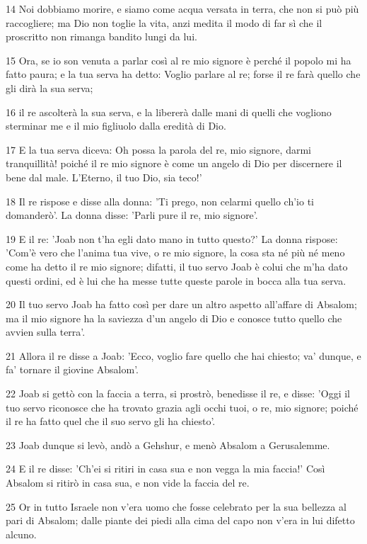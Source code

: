 \par 14 Noi dobbiamo morire, e siamo come acqua versata in terra, che non si può più raccogliere; ma Dio non toglie la vita, anzi medita il modo di far sì che il proscritto non rimanga bandito lungi da lui.
\par 15 Ora, se io son venuta a parlar così al re mio signore è perché il popolo mi ha fatto paura; e la tua serva ha detto: Voglio parlare al re; forse il re farà quello che gli dirà la sua serva;
\par 16 il re ascolterà la sua serva, e la libererà dalle mani di quelli che vogliono sterminar me e il mio figliuolo dalla eredità di Dio.
\par 17 E la tua serva diceva: Oh possa la parola del re, mio signore, darmi tranquillità! poiché il re mio signore è come un angelo di Dio per discernere il bene dal male. L'Eterno, il tuo Dio, sia teco!'
\par 18 Il re rispose e disse alla donna: 'Ti prego, non celarmi quello ch'io ti domanderò'. La donna disse: 'Parli pure il re, mio signore'.
\par 19 E il re: 'Joab non t'ha egli dato mano in tutto questo?' La donna rispose: 'Com'è vero che l'anima tua vive, o re mio signore, la cosa sta né più né meno come ha detto il re mio signore; difatti, il tuo servo Joab è colui che m'ha dato questi ordini, ed è lui che ha messe tutte queste parole in bocca alla tua serva.
\par 20 Il tuo servo Joab ha fatto così per dare un altro aspetto all'affare di Absalom; ma il mio signore ha la saviezza d'un angelo di Dio e conosce tutto quello che avvien sulla terra'.
\par 21 Allora il re disse a Joab: 'Ecco, voglio fare quello che hai chiesto; va' dunque, e fa' tornare il giovine Absalom'.
\par 22 Joab si gettò con la faccia a terra, si prostrò, benedisse il re, e disse: 'Oggi il tuo servo riconosce che ha trovato grazia agli occhi tuoi, o re, mio signore; poiché il re ha fatto quel che il suo servo gli ha chiesto'.
\par 23 Joab dunque si levò, andò a Gehshur, e menò Absalom a Gerusalemme.
\par 24 E il re disse: 'Ch'ei si ritiri in casa sua e non vegga la mia faccia!' Così Absalom si ritirò in casa sua, e non vide la faccia del re.
\par 25 Or in tutto Israele non v'era uomo che fosse celebrato per la sua bellezza al pari di Absalom; dalle piante dei piedi alla cima del capo non v'era in lui difetto alcuno.
